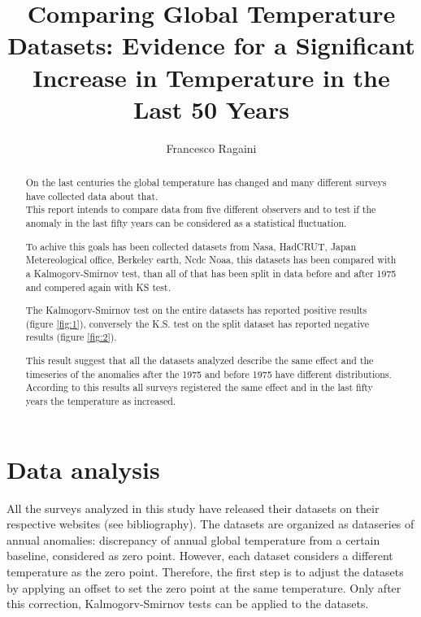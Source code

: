 \documentclass[a4paper,11pt,rmp,superscriptaddress]{revtex4}
\begin{document}
\title{Comparing Global Temperature Datasets: Evidence for a Significant Increase in Temperature in the Last 50 Years}
\author{Francesco Ragaini}
\begin{abstract}

On the last centuries the global temperature has changed and many different surveys have collected data about that.\\
This report intends to compare data from five different observers and to test if the anomaly in the last fifty years 
can be considered as a statistical fluctuation.

To achive this goals has been collected datasets from Nasa, HadCRUT, Japan Metereological office, Berkeley earth, Ncdc Noaa, 
this datasets has been compared with a Kalmogorv-Smirnov test, than all of that has been split in data before and after 1975 and compered 
again with KS test.

The Kalmogorv-Smirnov test on the entire datasets has reported positive results (figure \ref*{fig:1}), conversely the K.S. test 
on the split dataset has reported negative results (figure \ref*{fig:2}).

This result suggest that all the datasets analyzed describe the same effect and the timeseries of the anomalies after the 1975 and 
before 1975 have different distributions. According to this results all surveys registered the same effect
and in the last fifty years the temperature as increased.
\end{abstract}

\maketitle
\section*{Data analysis}
All the surveys analyzed in this study have released their datasets on their respective websites (see bibliography). 
The datasets are organized as dataseries of annual anomalies: discrepancy of annual global temperature from a certain baseline, 
considered as zero point.
However, each dataset considers a different temperature as the zero point. Therefore, 
the first step is to adjust the datasets by applying an offset to set the zero point at the same temperature. 
Only after this correction, Kalmogorv-Smirnov tests can be applied to the datasets.
\end{document}
